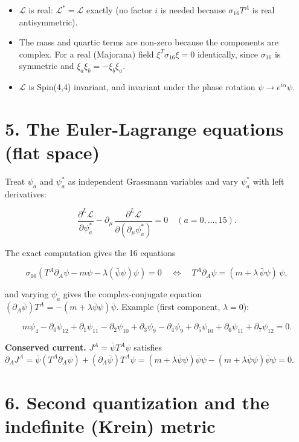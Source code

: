 \documentclass[10pt]{article}
\makeatletter
\newcommand\keepnext{\par\nopagebreak\@nobreaktrue\everypar{\@nobreakfalse\everypar{}}}
\makeatother
\begin{document}
\begin{itemize}
\item $\mathcal L$ is real: $\mathcal L^{*} = \mathcal L$ exactly (no factor $i$ is needed because $\sigma_{16}T^A$ is real antisymmetric).
\item The mass and quartic terms are non-zero because the components are complex. For a real (Majorana) field $\xi^T\sigma_{16}\xi = 0$ identically, since $\sigma_{16}$ is symmetric and $\xi_a\xi_b = -\xi_b\xi_a$.
\item $\mathcal L$ is Spin(4,4) invariant, and invariant under the phase rotation $\psi \to e^{i\alpha}\psi$.
\end{itemize}

\section*{5. The Euler-Lagrange equations (flat space)}

Treat $\psi_a$ and $\psi_a^{*}$ as independent Grassmann variables and vary $\psi_a^{*}$ with left derivatives:\keepnext


\[
\frac{\partial^L\mathcal L}{\partial\psi_a^{*}} - \partial_\mu\,\frac{\partial^L\mathcal L}{\partial(\partial_\mu\psi_a^{*})} = 0 \quad (a = 0,\dots,15).
\]

The exact computation gives the 16 equations\keepnext


\[
\sigma_{16}\left(T^A\partial_A\psi - m\psi - \lambda(\bar\psi\psi)\psi\right) = 0 \quad\Longleftrightarrow\quad T^A\partial_A\psi = (m + \lambda\,\bar\psi\psi)\,\psi ,
\]

and varying $\psi_a$ gives the complex-conjugate equation $(\partial_A\bar\psi)T^A = -(m + \lambda\bar\psi\psi)\bar\psi$. Example (first component, $\lambda = 0$):\keepnext


\[
m\psi_4 - \partial_0\psi_{12} + \partial_1\psi_{11} - \partial_2\psi_{10} + \partial_3\psi_9 - \partial_4\psi_9 + \partial_5\psi_{10} + \partial_6\psi_{11} + \partial_7\psi_{12} = 0 .
\]

\textbf{Conserved current.} $J^A = \bar\psi T^A\psi$ satisfies $\partial_AJ^A = \bar\psi(T^A\partial_A\psi) + (\partial_A\bar\psi)T^A\psi = (m+\lambda\bar\psi\psi)\bar\psi\psi - (m+\lambda\bar\psi\psi)\bar\psi\psi = 0$.


\section*{6. Second quantization and the indefinite (Krein) metric}
\end{document}
